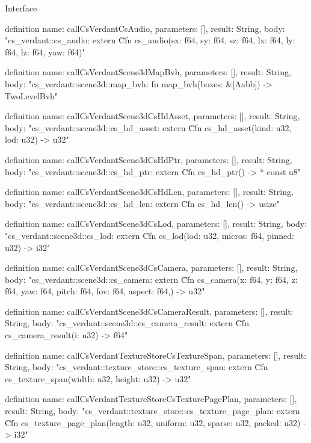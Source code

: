 \begin{lexlean}{Interface}
\begin{semanticmodule}
definition{
  name: callCsVerdantCsAudio,
  parameters: [],
  result: String,
  body: "cs_verdant::cs_audio: extern \"C\" fn cs_audio(sx: f64, sy: f64, sz: f64, lx: f64, ly: f64, lz: f64, yaw: f64)"
}

definition{
  name: callCsVerdantScene3dMapBvh,
  parameters: [],
  result: String,
  body: "cs_verdant::scene3d::map_bvh: fn map_bvh(boxes: &[Aabb]) -> TwoLevelBvh"
}

definition{
  name: callCsVerdantScene3dCsHdAsset,
  parameters: [],
  result: String,
  body: "cs_verdant::scene3d::cs_hd_asset: extern \"C\" fn cs_hd_asset(kind: u32, lod: u32) -> u32"
}

definition{
  name: callCsVerdantScene3dCsHdPtr,
  parameters: [],
  result: String,
  body: "cs_verdant::scene3d::cs_hd_ptr: extern \"C\" fn cs_hd_ptr() -> * const u8"
}

definition{
  name: callCsVerdantScene3dCsHdLen,
  parameters: [],
  result: String,
  body: "cs_verdant::scene3d::cs_hd_len: extern \"C\" fn cs_hd_len() -> usize"
}

definition{
  name: callCsVerdantScene3dCsLod,
  parameters: [],
  result: String,
  body: "cs_verdant::scene3d::cs_lod: extern \"C\" fn cs_lod(lod: u32, micros: f64, pinned: u32) -> i32"
}

definition{
  name: callCsVerdantScene3dCsCamera,
  parameters: [],
  result: String,
  body: "cs_verdant::scene3d::cs_camera: extern \"C\" fn cs_camera(x: f64, y: f64, z: f64, yaw: f64, pitch: f64, fov: f64, aspect: f64,) -> u32"
}

definition{
  name: callCsVerdantScene3dCsCameraResult,
  parameters: [],
  result: String,
  body: "cs_verdant::scene3d::cs_camera_result: extern \"C\" fn cs_camera_result(i: u32) -> f64"
}

definition{
  name: callCsVerdantTextureStoreCsTextureSpan,
  parameters: [],
  result: String,
  body: "cs_verdant::texture_store::cs_texture_span: extern \"C\" fn cs_texture_span(width: u32, height: u32) -> u32"
}

definition{
  name: callCsVerdantTextureStoreCsTexturePagePlan,
  parameters: [],
  result: String,
  body: "cs_verdant::texture_store::cs_texture_page_plan: extern \"C\" fn cs_texture_page_plan(length: u32, uniform: u32, sparse: u32, packed: u32) -> i32"
}


\end{semanticmodule}
\end{lexlean}
